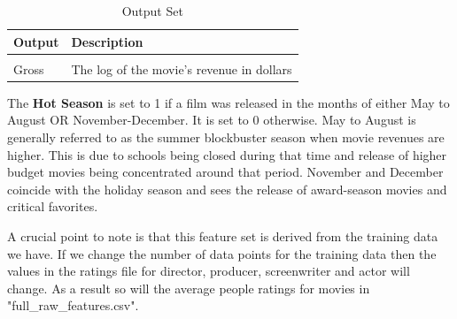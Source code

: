 \documentclass[conference]{IEEEtran}
\begin{document}
\begin{table}[h]
\caption{Output Set}
\label{table:datadict}
\begin{tabular}{l|l}
Output          & Description \\
\hline
\\
Gross & The log of the movie's revenue in dollars\\
\end{tabular}
\end{table}

The \textbf{Hot Season} is set to 1 if a film was released in the months of either May to August OR November-December. It is set to 0 otherwise. May to August is generally referred to as the summer blockbuster season when movie revenues are higher. This is due to schools being closed during that time and release of higher budget movies being concentrated around that period. November and December coincide with the holiday season and sees the release of award-season movies and critical favorites.

A crucial point to note is that this feature set is derived from the training data we have. If we change the number of data points for the training data then the values in the ratings file for director, producer, screenwriter and actor will change. As a result so will the average people ratings for movies in "full\_raw\_features.csv".


\end{document}
